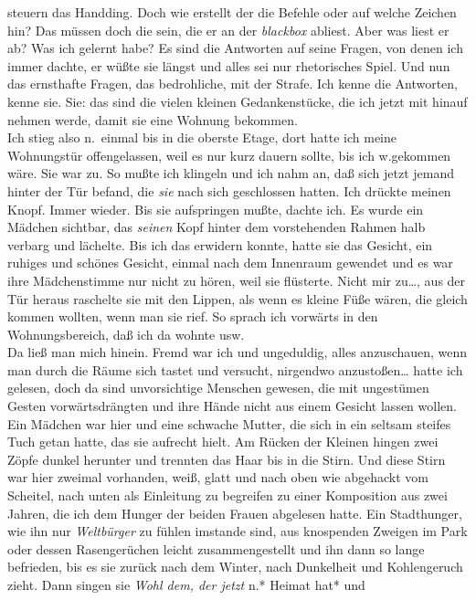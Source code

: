 \documentclass[
]{article}
\begin{document}
steuern das Handding. Doch wie erstellt der die Befehle oder auf welche
Zeichen hin? Das müssen doch die sein, die er an der \emph{blackbox}
abliest. Aber was liest er ab? Was ich gelernt habe? Es sind die
Antworten auf seine Fragen, von denen ich immer dachte, er wüßte sie
längst und alles sei nur rhetorisches Spiel. Und nun das ernsthafte
Fragen, das bedrohliche, mit der Strafe. Ich kenne die Antworten, kenne
sie. Sie: das sind die vielen kleinen Gedankenstücke, die ich jetzt mit
hinauf nehmen werde, damit sie eine Wohnung bekommen.\\
Ich stieg also n.~einmal bis in die oberste Etage, dort hatte ich meine
Wohnungstür offengelassen, weil es nur kurz dauern sollte, bis ich
w.gekommen wäre. Sie war zu. So mußte ich klingeln und ich nahm an, daß
sich jetzt jemand hinter der Tür befand, die \emph{sie} nach sich
geschlossen hatten. Ich drückte meinen Knopf. Immer wieder. Bis sie
aufspringen mußte, dachte ich. Es wurde ein Mädchen sichtbar, das
\emph{seinen} Kopf hinter dem vorstehenden Rahmen halb verbarg und
lächelte. Bis ich das erwidern konnte, hatte sie das Gesicht, ein
ruhiges und schönes Gesicht, einmal nach dem Innenraum gewendet und es
war ihre Mädchenstimme nur nicht zu hören, weil sie flüsterte. Nicht mir
zu\ldots, aus der Tür heraus raschelte sie mit den Lippen, als wenn es
kleine Füße wären, die gleich kommen wollten, wenn man sie rief. So
sprach ich vorwärts in den Wohnungsbereich, daß ich da wohnte usw.\\
Da ließ man mich hinein. Fremd war ich und ungeduldig, alles
anzuschauen, wenn man durch die Räume sich tastet und versucht,
nirgendwo anzustoßen\ldots{} hatte ich gelesen, doch da sind
unvorsichtige Menschen gewesen, die mit ungestümen Gesten
vorwärtsdrängten und ihre Hände nicht aus einem Gesicht lassen wollen.
Ein Mädchen war hier und eine schwache Mutter, die sich in ein seltsam
steifes Tuch getan hatte, das sie aufrecht hielt. Am Rücken der Kleinen
hingen zwei Zöpfe dunkel herunter und trennten das Haar bis in die
Stirn. Und diese Stirn war hier zweimal vorhanden, weiß, glatt und nach
oben wie abgehackt vom Scheitel, nach unten als Einleitung zu begreifen
zu einer Komposition aus zwei Jahren, die ich dem Hunger der beiden
Frauen abgelesen hatte. Ein Stadthunger, wie ihn nur \emph{Weltbürger}
zu fühlen imstande sind, aus knospenden Zweigen im Park oder dessen
Rasengerüchen leicht zusammengestellt und ihn dann so lange befrieden,
bis es sie zurück nach dem Winter, nach Dunkelheit und Kohlengeruch
zieht. Dann singen sie \emph{Wohl dem, der jetzt }n.* Heimat hat* und
\end{document}
